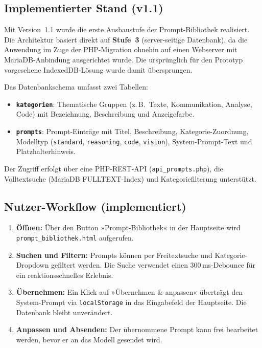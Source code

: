 \documentclass[12pt, a4paper]{article}
\begin{document}
\subsection{Implementierter Stand (v1.1)}

Mit Version~1.1 wurde die erste Ausbaustufe der Prompt-Bibliothek realisiert. Die Architektur basiert direkt auf \textbf{Stufe~3} (server-seitige Datenbank), da die Anwendung im Zuge der PHP-Migration ohnehin auf einen Webserver mit MariaDB-Anbindung ausgerichtet wurde. Die ursprünglich für den Prototyp vorgesehene IndexedDB-Lösung wurde damit übersprungen.

Das Datenbankschema umfasst zwei Tabellen:

\begin{itemize}[leftmargin=1.5cm]
  \item \textbf{\texttt{kategorien}}: Thematische Gruppen (z.\,B.\ Texte, Kommunikation, Analyse, Code) mit Bezeichnung, Beschreibung und Anzeigefarbe.
  \item \textbf{\texttt{prompts}}: Prompt-Einträge mit Titel, Beschreibung, Kategorie-Zuordnung, Modelltyp (\texttt{standard}, \texttt{reasoning}, \texttt{code}, \texttt{vision}), System-Prompt-Text und Platzhalterhinweis.
\end{itemize}

Der Zugriff erfolgt über eine PHP-REST-API (\texttt{api\_prompts.php}), die Volltextsuche (MariaDB FULLTEXT-Index) und Kategoriefilterung unterstützt.

\subsection{Nutzer-Workflow (implementiert)}

\begin{enumerate}[leftmargin=1.5cm]
  \item \textbf{Öffnen:} Über den Button »Prompt-Bibliothek« in der Hauptseite wird \texttt{prompt\_bibliothek.html} aufgerufen.
  \item \textbf{Suchen und Filtern:} Prompts können per Freitextsuche und Kategorie-Dropdown gefiltert werden. Die Suche verwendet einen 300\,ms-Debounce für ein reaktionsschnelles Erlebnis.
  \item \textbf{Übernehmen:} Ein Klick auf »Übernehmen \& anpassen« überträgt den System-Prompt via \texttt{localStorage} in das Eingabefeld der Hauptseite. Die Datenbank bleibt unverändert.
  \item \textbf{Anpassen und Absenden:} Der übernommene Prompt kann frei bearbeitet werden, bevor er an das Modell gesendet wird.
\end{enumerate}
\end{document}
